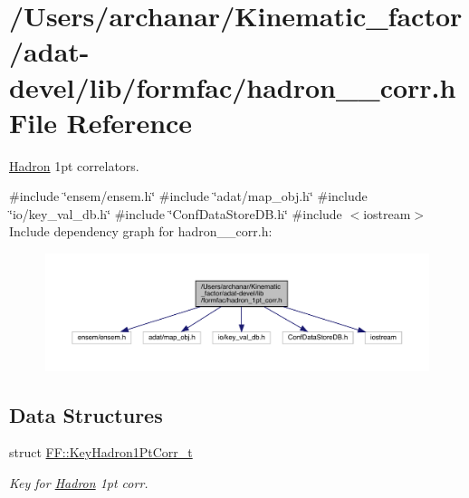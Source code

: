 \hypertarget{adat-devel_2lib_2formfac_2hadron__1pt__corr_8h}{}\section{/\+Users/archanar/\+Kinematic\+\_\+factor/adat-\/devel/lib/formfac/hadron\+\_\+1pt\+\_\+corr.h File Reference}
\label{adat-devel_2lib_2formfac_2hadron__1pt__corr_8h}


\mbox{\hyperlink{namespaceHadron}{Hadron}} 1pt correlators.  


{\ttfamily \#include \char`\"{}ensem/ensem.\+h\char`\"{}}\newline
{\ttfamily \#include \char`\"{}adat/map\+\_\+obj.\+h\char`\"{}}\newline
{\ttfamily \#include \char`\"{}io/key\+\_\+val\+\_\+db.\+h\char`\"{}}\newline
{\ttfamily \#include \char`\"{}Conf\+Data\+Store\+D\+B.\+h\char`\"{}}\newline
{\ttfamily \#include $<$iostream$>$}\newline
Include dependency graph for hadron\+\_\+1pt\+\_\+corr.\+h\+:
\nopagebreak
\begin{figure}[H]
\begin{center}
\leavevmode
\includegraphics[width=350pt]{d7/dfe/adat-devel_2lib_2formfac_2hadron__1pt__corr_8h__incl}
\end{center}
\end{figure}
\subsection*{Data Structures}
\begin{DoxyCompactItemize}
\item 
struct \mbox{\hyperlink{structFF_1_1KeyHadron1PtCorr__t}{F\+F\+::\+Key\+Hadron1\+Pt\+Corr\+\_\+t}}
\begin{DoxyCompactList}\small\item\em Key for \mbox{\hyperlink{namespaceHadron}{Hadron}} 1pt corr. \end{DoxyCompactList}\end{DoxyCompactItemize}
